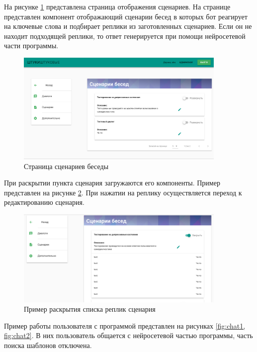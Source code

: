 На рисунке \ref{fig:scenario} представлена страница отображения сценариев. На странице представлен компонент отображающий сценарии бесед в которых бот реагирует на ключевые слова и подбирает реплики из заготовленных сценариев. Если он не находит подходящей реплики, то ответ генерируется при помощи нейросетевой части программы.

\begin{figure}[H]
    \centering
    \includegraphics[width=0.9\textwidth]{image/scenario_page.png}
    \caption{Страница сценариев беседы}
    \label{fig:scenario}
\end{figure}

При раскрытии пункта сценария загружаются его компоненты. Пример представлен на рисунке \ref{fig:scenario_open}. При нажатии на реплику осуществляется переход к редактированию сценария. 

\begin{figure}[H]
    \centering
    \includegraphics[width=0.9\textwidth]{image/scenario_open_page.png}
    \caption{Пример раскрытия списка реплик сценария}
    \label{fig:scenario_open}
\end{figure}

Пример работы пользователя с программой представлен на рисунках \ref{fig:chat1, fig:chat2}. В них пользователь общается с нейросетевой частью программы, часть поиска шаблонов отключена.   

